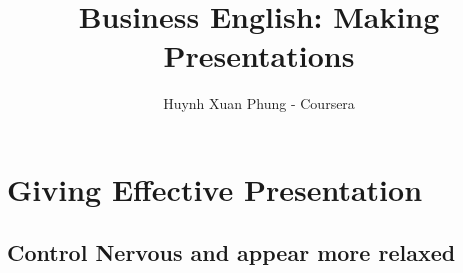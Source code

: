 \documentclass{article}
\title{Business English: Making Presentations}
\author{Huynh Xuan Phung - Coursera}
\date{ }
\begin{document}
 
\maketitle
 
\tableofcontents
\section{Giving Effective Presentation}
\subsection{Control Nervous and appear more relaxed}

 
 
\end{document}
